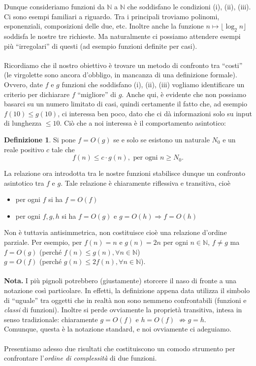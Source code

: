 \documentclass[12pt,a4paper]{report}
\theoremstyle{definition}
\newtheorem{defn}[teo]{Definizione}  %
\begin{document}
Dunque consideriamo funzioni da $\mathbb{N}$ a $\mathbb{N}$ che soddisfano le condizioni (i), (ii), (iii).\\
Ci sono esempi familiari a riguardo. Tra i principali troviamo polinomi, esponenziali, composizioni delle due, etc. Inoltre anche la funzione $n \mapsto \lfloor \log_2 n \rfloor$ soddisfa le nostre tre richieste. Ma naturalmente ci possiamo attendere esempi più ``irregolari'' di questi (ad esempio funzioni definite per casi).\\
\\
Ricordiamo che il nostro obiettivo è trovare un metodo di confronto tra ``costi'' (le virgolette sono ancora d'obbligo, in mancanza di una definizione formale). Ovvero, date $f$ e $g$ funzioni che soddisfano (i), (ii), (iii) vogliamo identificare un criterio per dichiarare $f$ ``migliore'' di $g$. Anche qui, è evidente che non possiamo basarci su un numero limitato di casi, quindi certamente il fatto che, ad esempio $f(10) \leq g(10)$, ci interessa ben poco, dato che ci dà informazioni solo su input di lunghezza $\leq 10$. Ciò che a noi interessa è il comportamento asintotico:

\begin{defn}
Si pone $f=O(g)$ se e solo se esistono un naturale $N_0$ e un reale positivo $c$ tale che 
$$f(n) \leq c \cdot g(n), \text{ per ogni } n \geq N_0.$$
\end{defn}

La relazione ora introdotta tra le nostre funzioni stabilisce dunque un confronto asintotico tra $f$ e $g$. Tale relazione è chiaramente riflessiva e transitiva, cioè 
\begin{itemize}
\item per ogni $f$ si ha $f=O(f)$ 
\item per ogni $f,g,h$ si ha $f=O(g) \text{ e } g=O(h) \Rightarrow f=O(h)$ 
\end{itemize}
Non è tuttavia antisimmetrica, non costituisce cioè una relazione d'ordine parziale. Per esempio, per $f(n)=n$ e $g(n)=2n$ per ogni $n \in \mathbb{N}$, $f \neq g$ ma\\
\indent $f=O(g)$ (perché $f(n) \leq g(n), \forall n \in \mathbb{N}$)\\
\indent $g=O(f)$ (perché $g(n) \leq 2f(n), \forall n \in \mathbb{N}$).\\
\\
\noindent \textbf{Nota.} I più pignoli potrebbero (giustamente) storcere il naso di fronte a una notazione così particolare. In effetti, la definizione appena data utilizza il simbolo di ``uguale'' tra oggetti che in realtà non sono nemmeno confrontabili (funzioni e \emph{classi} di funzioni). Inoltre si perde ovviamente la proprietà transitiva, intesa in senso tradizionale: chiaramente $g=O(f)$ e $h=O(f)$ $\not\Longrightarrow g=h$.\\
Comunque, questa è la notazione standard, e noi ovviamente ci adeguiamo.\\
\\
Presentiamo adesso due risultati che costituiscono un comodo strumento per confrontare l'\emph{ordine di complessità} di due funzioni.
\end{document}
